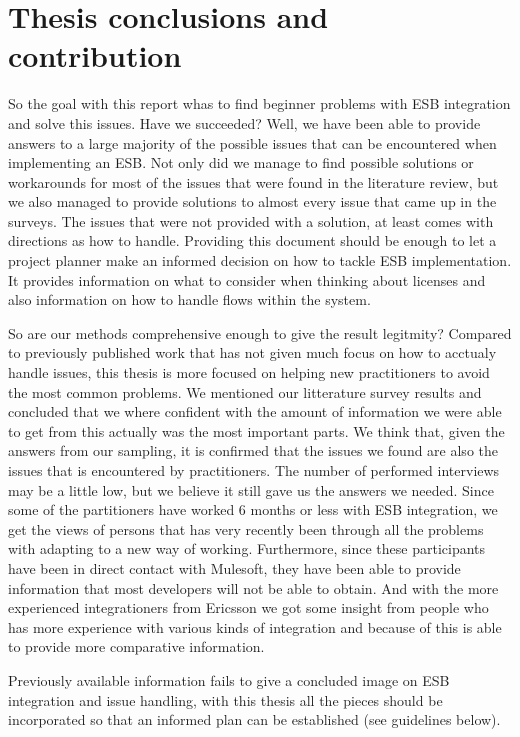 \documentclass{llncs}
\begin{document}
\section{Thesis conclusions and contribution}
So the goal with this report whas to find beginner problems with ESB integration and solve this issues. Have we succeeded? Well, we have been able to provide answers to a large majority of the possible issues that can be encountered when implementing an ESB. Not only did we manage to find possible solutions or workarounds for most of the issues that were found in the literature review, but we also managed to provide solutions to almost every issue that came up in the surveys.
The issues that were not provided with a solution, at least comes with directions as how to handle. Providing this document should be enough to let a project planner make an informed decision on how to tackle ESB implementation. It provides information on what to consider when thinking about licenses and also information on how to handle flows within the system.

So are our methods comprehensive enough to give the result legitmity? Compared to previously published work that has not given much focus on how to acctualy handle issues, this thesis is more focused on helping new practitioners to avoid the most common problems.
We mentioned our litterature survey results and concluded that we where confident with the amount of information we were able to get from this actually was the most important parts. We think that, given the answers from our sampling, it is confirmed that the issues we found are also the issues that is encountered by practitioners.
The number of performed interviews may be a little low, but we believe it still gave us the answers we needed. Since some of the partitioners have worked 6 months or less with ESB integration, we get the views of persons that has very recently been through all the problems with adapting to a new way of working. Furthermore, since these participants have been in direct contact with Mulesoft, they have been able to provide information that most developers will not be able to obtain. And with the more experienced integrationers from Ericsson we got some insight from people who has more experience with various kinds of integration and because of this is able to provide more comparative information.

Previously available information fails to give a concluded image on ESB integration and issue handling, with this thesis all the pieces should be incorporated so that an informed plan can be established (see guidelines below).
\end{document}
